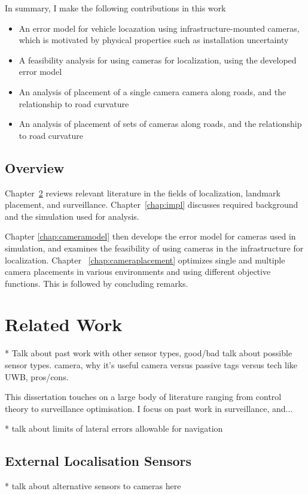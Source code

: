 \documentclass[a4paper,12pt,twoside,openright]{report}
\begin{document}
In summary, I make the following contributions in this work
\begin{itemize}
    \item An error model for vehicle locazation using infrastructure-mounted cameras, which is motivated by physical properties such as installation uncertainty
    \item A feasibility analysis for using cameras for localization, using the developed error model
    \item An analysis of placement of a single camera camera along roads, and the relationship to road curvature
    \item An analysis of placement of sets of cameras along roads, and the relationship to road curvature
\end{itemize}



\section{Overview}

Chapter~\ref{chap:relatedwork} reviews relevant literature in the fields of
localization, landmark placement, and surveillance. Chapter~\ref{chap:impl} discusses required background and the simulation
used for analysis. 

Chapter \ref{chap:cameramodel} then develops the error model for cameras
used in simulation, and examines the feasibility of using cameras in the infrastructure for localization.
Chapter ~\ref{chap:cameraplacement} optimizes single and multiple camera placements
in various environments and using different objective functions. This is followed by concluding remarks.

\chapter{Related Work} 
\label{chap:relatedwork}

* Talk about past work with other sensor types, good/bad
talk about possible sensor types. camera, why it's useful
camera versus passive tags versus tech like UWB, pros/cons.

This dissertation touches on a large body of literature ranging from 
control theory to surveillance optimisation. I focus on past work
in surveillance, and... 

* talk about limits of lateral errors allowable for navigation

\section{External Localisation Sensors}
* talk about alternative sensors to cameras here
\end{document}

